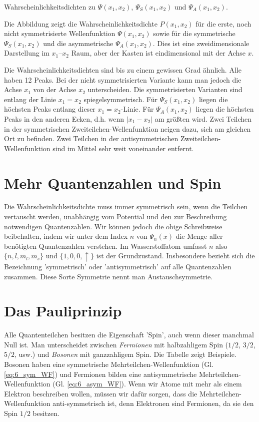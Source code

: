\begin{marginfigure}
    \caption{Wahrscheinlichkeitsdichten zu $ \Psi(x_1, x_2)$,  $ \Psi_S(x_1, x_2)$ und  $ \Psi_A(x_1, x_2)$.}
\end{marginfigure}

Die Abbildung  zeigt die Wahrscheinlichkeitsdichte $ P(x_1, x_2) $ für die erste, noch nicht symmetrisierte Wellenfunktion $ \Psi(x_1, x_2)$ sowie für die symmetrische $ \Psi_S(x_1, x_2)$ und die asymmetrische $ \Psi_A(x_1, x_2)$. Dies ist eine zweidimensionale Darstellung im $x_1$--$x_2$ Raum, aber der Kasten ist eindimensional mit der Achse $x$.


Die Wahrscheinlichkeitsdichten sind bis zu einem gewissen Grad ähnlich. Alle haben 12 Peaks. Bei der nicht symmetrisierten Variante kann man jedoch die Achse $x_1$ von der Achse $x_2$ unterscheiden.
Die symmetrisierten Varianten sind entlang der Linie $x_1 = x_2$ spiegelsymmetrisch. Für $\Psi_S(x_1, x_2)$ liegen die höchsten Peaks entlang dieser $x_1 = x_2$-Linie. Für $\Psi_A(x_1, x_2)$ liegen die höchsten Peaks in den anderen Ecken, d.h. wenn $|x_1 - x_2|$ am größten wird. Zwei Teilchen in der symmetrischen Zweiteilchen-Wellenfunktion neigen dazu, sich am gleichen Ort zu befinden. Zwei Teilchen in der antisymmetrischen Zweiteilchen-Wellenfunktion sind im Mittel sehr weit voneinander entfernt.


\section{Mehr Quantenzahlen und Spin}

Die Wahrscheinlichkeitsdichte muss immer symmetrisch sein, wenn die Teilchen vertauscht werden, unabhängig vom Potential und den zur Beschreibung notwendigen Quantenzahlen. Wir können jedoch die obige Schreibweise beibehalten, indem wir unter dem Index $n$ von $\Psi_n(x)$ die Menge aller benötigten Quantenzahlen verstehen. Im Wasserstoffatom umfasst $n$ also $\{ n, l, m_l, m_s \}$ und $\{ 1, 0, 0, \uparrow \}$ ist der Grundzustand. Insbesondere bezieht sich die Bezeichnung 'symmetrisch' oder 'antisymmetrisch' auf alle Quantenzahlen zusammen. Diese Sorte Symmetrie nennt man Austauschsymmetrie.



\section{Das Pauliprinzip}


Alle Quantenteilchen besitzen die Eigenschaft 'Spin', auch wenn dieser manchmal Null ist. Man unterscheidet zwischen \emph{Fermionen} mit halbzahligem Spin ($1/2$, $3/2$, $5/2$, usw.) und \emph{Bosonen} mit ganzzahligem Spin. Die Tabelle zeigt Beispiele. Bosonen haben eine symmetrische Mehr\-teil\-chen-Wellenfunktion (Gl. \ref{eq:6_sym_WF}) und Fermionen bilden eine antisymmetrische Mehrteilchen-Wellenfunktion (Gl. \ref{eq:6_asym_WF}). Wenn wir Atome mit mehr als einem Elektron beschreiben wollen, müssen wir dafür sorgen, dass die Mehrteilchen-Wellenfunktion anti-symmetrisch ist, denn Elektronen sind Fermionen, da sie den Spin $1/2$ besitzen.

